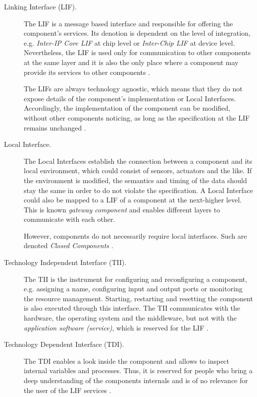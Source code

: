 \begin{description}
\item [Linking Interface (LIF).] 
The LIF is a message based interface and responsible for offering the component's services. Its denotion is dependent on the level of integration, e.g. \emph{Inter-IP Core LIF} at chip level or \emph{Inter-Chip LIF} at device level. Nevertheless, the LIF is used only for communication to other components at the same layer and it is also the only place where a component may provide its services to other components \cite[p.9]{genesys}.

The LIFs are always technology agnostic, which means that they do not expose details of the component's implementation or Local Interfaces. Accordingly, the implementation of the component can be modified, without other components noticing, as long as the specification at the LIF remains unchanged \cite[p.9, 40-41]{genesys}.

\item [Local Interface.] 
The Local Interfaces establish the connection between a component and its local environment, which could consist of sensors, actuators and the like. If the environment is modified, the semantics and timing of the data should stay the same in order to do not violate the specification. A Local Interface could also be mapped to a LIF of a component at the next-higher level. This is known \emph{gateway component} and enables different layers to communicate with each other.

However, components do not necessarily require local interfaces. Such are denoted \emph{Closed Components} \cite[p.40-41]{genesys}.

\item [Technology Independent Interface (TII).]
The TII is the instrument for configuring and reconfiguring a component, e.g. assigning a name, configuring input and output ports or monitoring the resource management. Starting, restarting and resetting the component is also executed through this interface. The TII communicates with the hardware, the operating system and the middleware, but not with the \emph{application software (service)}, which is reserved for the LIF \cite[p.40-41]{genesys}.

\item [Technology Dependent Interface (TDI).] 
The TDI enables a look inside the component and allows to inspect internal variables and processes. Thus, it is reserved for people who bring a deep understanding of the components internals and is of no relevance for the user of the LIF services \cite[p.40-41]{genesys}. 
\end{description}

